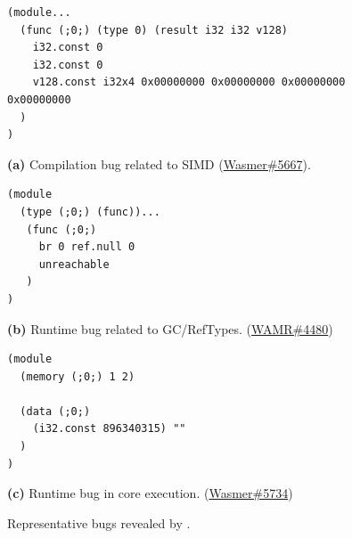 \begin{figure}[t]
\centering


\begin{lstlisting}[style=watpaper]
(module...
  (func (;0;) (type 0) (result i32 i32 v128)
    i32.const 0
    i32.const 0
    v128.const i32x4 0x00000000 0x00000000 0x00000000 0x00000000
  )
)
\end{lstlisting}
{\footnotesize
\textbf{(a)} Compilation bug related to SIMD
(\href{https://github.com/wasmerio/wasmer/issues/5667}{Wasmer\#5667}).
\par}


\begin{minipage}[t]{0.48\linewidth}
\begin{lstlisting}[style=watpaper]
(module
  (type (;0;) (func))...
   (func (;0;)
     br 0 ref.null 0
     unreachable
   )
)
\end{lstlisting}
{\footnotesize
\textbf{(b)} Runtime bug related to GC/RefTypes.
(\href{https://github.com/bytecodealliance/wasm-micro-runtime/issues/4480}{WAMR\#4480})
\par}
\end{minipage}\hfill%
\begin{minipage}[t]{0.48\linewidth}
\begin{lstlisting}[style=watpaper]
(module
  (memory (;0;) 1 2)

  (data (;0;)
    (i32.const 896340315) ""
  )
)
\end{lstlisting}
{\footnotesize
\textbf{(c)} Runtime bug in core execution.
(\href{https://github.com/wasmerio/wasmer/issues/5734}{Wasmer\#5734})
\par}
\end{minipage}

\smallskip

{\footnotesize
\caption{Representative bugs revealed by \tname{}.}
\label{example:bug_examples}
}

\end{figure}
